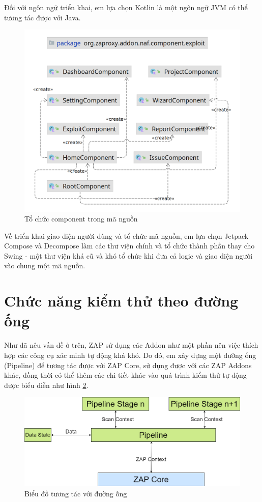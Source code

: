 \documentclass[./../main.tex]{subfiles}
\begin{document}
Đối với ngôn ngữ triển khai, em lựa chọn Kotlin là một ngôn ngữ JVM
có thể tương tác được với Java.

\begin{figure}[ht!]
	\includegraphics[width=\linewidth]{./images/package.png}
	\caption{Tổ chức component trong mã nguồn}
	\label{fig:package}
\end{figure}

Về triển khai giao diện người dùng và tổ chức mã nguồn, em lựa chọn
Jetpack Compose và Decompose làm các thư viện chính và tổ chức thành phần
thay cho Swing - một thư viện khá cũ và khó tổ chức khi đưa cả logic và
giao diện người vào chung một mã nguồn.

\section{Chức năng kiểm thử theo đường ống}
Như đã nêu vấn đề ở trên, ZAP sử dụng các Addon như một phần nên việc
thích hợp các công cụ xác minh tự động khá khó. Do đó, em xây dựng một
đường ống (Pipeline) để tương tác được với ZAP Core, sử dụng được với các
ZAP Addons khác, đồng thời có thể thêm các chi tiết khác vào quá trình kiểm
thử tự động được biểu diễn như hình \ref{fig:pipeline_component}.

\begin{figure}[ht!]
	\includegraphics[width=\linewidth]{./images/pipeline_component.png}
	\caption{Biểu đồ tương tác với đường ống}
	\label{fig:pipeline_component}
\end{figure}
\end{document}
